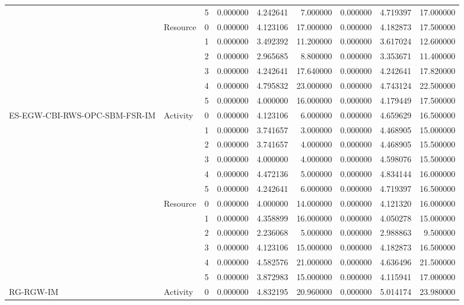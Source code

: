 \begin{tabular}{lllrrrrrr}
 &  & 5 & 0.000000 & 4.242641 & 7.000000 & 0.000000 & 4.719397 & 17.000000 \\
\cline{2-3}
 & \multirow[c]{6}{*}{Resource} & 0 & 0.000000 & 4.123106 & 17.000000 & 0.000000 & 4.182873 & 17.500000 \\
 &  & 1 & 0.000000 & 3.492392 & 11.200000 & 0.000000 & 3.617024 & 12.600000 \\
 &  & 2 & 0.000000 & 2.965685 & 8.800000 & 0.000000 & 3.353671 & 11.400000 \\
 &  & 3 & 0.000000 & 4.242641 & 17.640000 & 0.000000 & 4.242641 & 17.820000 \\
 &  & 4 & 0.000000 & 4.795832 & 23.000000 & 0.000000 & 4.743124 & 22.500000 \\
 &  & 5 & 0.000000 & 4.000000 & 16.000000 & 0.000000 & 4.179449 & 17.500000 \\
\cline{1-3} \cline{2-3}
\multirow[c]{12}{*}{ES-EGW-CBI-RWS-OPC-SBM-FSR-IM} & \multirow[c]{6}{*}{Activity} & 0 & 0.000000 & 4.123106 & 6.000000 & 0.000000 & 4.659629 & 16.500000 \\
 &  & 1 & 0.000000 & 3.741657 & 3.000000 & 0.000000 & 4.468905 & 15.000000 \\
 &  & 2 & 0.000000 & 3.741657 & 4.000000 & 0.000000 & 4.468905 & 15.500000 \\
 &  & 3 & 0.000000 & 4.000000 & 4.000000 & 0.000000 & 4.598076 & 15.500000 \\
 &  & 4 & 0.000000 & 4.472136 & 5.000000 & 0.000000 & 4.834144 & 16.000000 \\
 &  & 5 & 0.000000 & 4.242641 & 6.000000 & 0.000000 & 4.719397 & 16.500000 \\
\cline{2-3}
 & \multirow[c]{6}{*}{Resource} & 0 & 0.000000 & 4.000000 & 14.000000 & 0.000000 & 4.121320 & 16.000000 \\
 &  & 1 & 0.000000 & 4.358899 & 16.000000 & 0.000000 & 4.050278 & 15.000000 \\
 &  & 2 & 0.000000 & 2.236068 & 5.000000 & 0.000000 & 2.988863 & 9.500000 \\
 &  & 3 & 0.000000 & 4.123106 & 15.000000 & 0.000000 & 4.182873 & 16.500000 \\
 &  & 4 & 0.000000 & 4.582576 & 21.000000 & 0.000000 & 4.636496 & 21.500000 \\
 &  & 5 & 0.000000 & 3.872983 & 15.000000 & 0.000000 & 4.115941 & 17.000000 \\
\cline{1-3} \cline{2-3}
\multirow[c]{12}{*}{RG-RGW-IM} & \multirow[c]{6}{*}{Activity} & 0 & 0.000000 & 4.832195 & 20.960000 & 0.000000 & 5.014174 & 23.980000 \\

\end{tabular}

